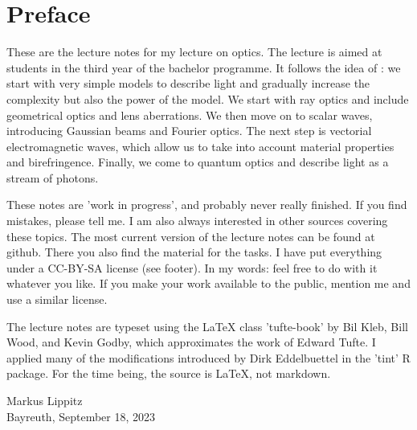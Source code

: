 \renewcommand{\lastmod}{\ \ }
\renewcommand{\chapterauthors}{\ \ }

\chapter*{Preface}

These are the lecture notes for my lecture on optics. The lecture is aimed at students in the third year of the bachelor programme. It follows the idea of \cite{SalehTeich1991}: we start with very simple models to describe light and gradually increase the complexity but also the power of the model. We start with ray optics and include geometrical optics and lens aberrations. We then move on to scalar waves, introducing Gaussian beams and Fourier optics. The next step is vectorial electromagnetic waves, which allow us to take into account material properties and birefringence. Finally, we come to quantum optics and describe light as a stream of photons.



These notes are 'work in progress', and probably never really finished. If you find mistakes, please tell me. I am also always interested in other sources covering these topics.
The most current version of the lecture notes can be found at github. There you also find the material for the tasks. I have put everything under a CC-BY-SA license (see footer). In my words: feel free to do with it whatever you like. If you make your work available to the public, mention me and use a similar license. 


The lecture notes are typeset using the LaTeX class 'tufte-book' by Bil Kleb, Bill Wood, and Kevin Godby, which  approximates the work of Edward Tufte. I applied many of the modifications introduced by Dirk Eddelbuettel in the 'tint' R package. For the time being, the source is LaTeX, not markdown.

\vspace{2\baselineskip}

Markus Lippitz \\ Bayreuth, September 18, 2023


